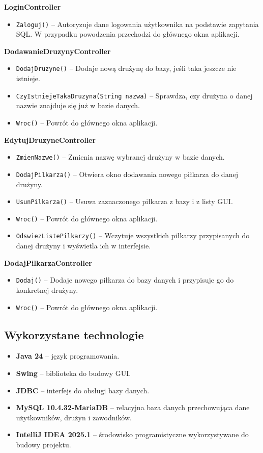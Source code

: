 \documentclass{urdpl}     %
\begin{document}
\textbf{LoginController}
\begin{itemize}
  \item \texttt{Zaloguj()} – Autoryzuje dane logowania użytkownika na podstawie zapytania SQL. W przypadku powodzenia przechodzi do głównego okna aplikacji.
\end{itemize}

\textbf{DodawanieDruzynyController}
\begin{itemize}
  \item \texttt{DodajDruzyne()} – Dodaje nową drużynę do bazy, jeśli taka jeszcze nie istnieje.
  \item \texttt{CzyIstniejeTakaDruzyna(String nazwa)} – Sprawdza, czy drużyna o danej nazwie znajduje się już w bazie danych.
  \item \texttt{Wroc()} – Powrót do głównego okna aplikacji.
\end{itemize}

\textbf{EdytujDruzyneController}
\begin{itemize}
  \item \texttt{ZmienNazwe()} – Zmienia nazwę wybranej drużyny w bazie danych.
  \item \texttt{DodajPilkarza()} – Otwiera okno dodawania nowego piłkarza do danej drużyny.
  \item \texttt{UsunPilkarza()} – Usuwa zaznaczonego piłkarza z bazy i z listy GUI.
  \item \texttt{Wroc()} – Powrót do głównego okna aplikacji.
  \item \texttt{OdswiezListePilkarzy()} – Wczytuje wszystkich piłkarzy przypisanych do danej drużyny i wyświetla ich w interfejsie.
\end{itemize}

\textbf{DodajPilkarzaController}
\begin{itemize}
  \item \texttt{Dodaj()} – Dodaje nowego piłkarza do bazy danych i przypisuje go do konkretnej drużyny.
  \item \texttt{Wroc()} – Powrót do głównego okna aplikacji.
\end{itemize}


\subsection{Wykorzystane technologie}

\begin{itemize}
  \item \textbf{Java 24} – język programowania.
  \item \textbf{Swing} – biblioteka do budowy GUI.
  \item \textbf{JDBC} – interfejs do obsługi bazy danych.
  \item \textbf{MySQL 10.4.32-MariaDB} – relacyjna baza danych przechowująca dane użytkowników, drużyn i zawodników.
  \item \textbf{IntelliJ IDEA 2025.1} – środowisko programistyczne wykorzystywane do budowy projektu.
\end{itemize}
\end{document}
